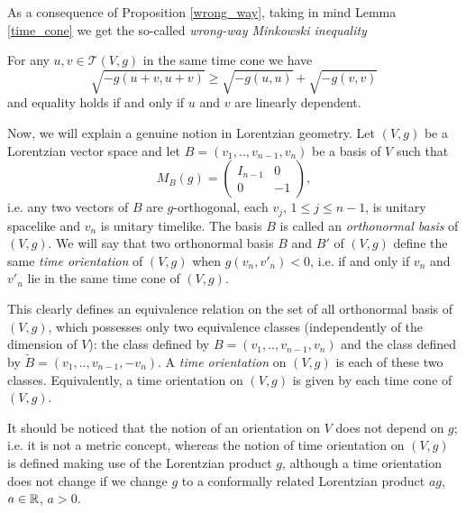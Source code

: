 As a consequence of Proposition \ref{wrong_way}, taking in mind Lemma \ref{time_cone} we get the so-called \emph{wrong-way Minkowski inequality} \cite[Cor. 5.31]{oneill83}

\begin{corollary}\label{Minkowski}
    For any $u,v \in \mathcal{T}(V,g)$ in the same time cone we have
    \[
        \sqrt{-g(u+v,u+v)} \geq \sqrt{-g(u,u)}+\sqrt{-g(v,v)}
    \]
    and equality holds if and only if $u$ and $v$ are linearly dependent.
\end{corollary}


Now, we will explain a genuine notion in Lorentzian geometry. Let $(V,g)$ be a Lorentzian
vector space and let $B=(v_1,..,v_{n-1},v_n)$ be a basis of $V$ such that
\[
M_B(g) = \left( \begin{array}{cc}
I_{n-1} & 0  \\
0 & -1
\end{array} \right),
\]
i.e. any two vectors of $B$ are $g$-orthogonal, each $v_j$, $1\leq j \leq n-1$, is unitary spacelike and
$v_n$ is unitary timelike. The basis $B$ is called an \emph{orthonormal basis} of $(V,g)$. We will say
that two orthonormal basis $B$ and $B'$ of $(V,g)$ define the same \emph{time orientation} of $(V,g)$
when $g(v_n,v'_n)<0$, i.e. if and only if $v_n$ and $v'_n$ lie in the same time cone of $(V,g)$.

\vspace{2mm}

This clearly defines an equivalence relation on the set of all orthonormal basis of $(V,g)$, which possesses
only two equivalence classes (independently of the dimension of $V$): the class defined by $B=(v_1,..,v_{n-1},v_n)$
and the class defined by $\tilde{B}=(v_1,..,v_{n-1},-v_n)$. A \emph{time orientation} on $(V,g)$ is each of these
two classes. Equivalently, a time orientation on $(V,g)$ is given by each time cone of $(V,g)$.

\vspace{2mm}

It should be noticed that the notion of an orientation on $V$ does not depend on $g$; i.e. it is not
a metric concept, whereas the notion of time orientation on $(V,g)$ is defined making use of the Lorentzian
product $g$, although a time orientation does not change if we change $g$ to a conformally related Lorentzian product
$ag$, $a\in \mathbb{R}$, $a>0$.

\vspace{2mm}

